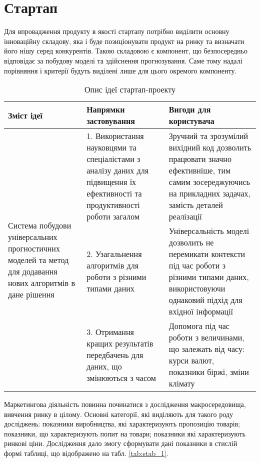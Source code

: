 \section{Стартап}
Для впровадження продукту в якості стартапу потрібно виділити основну інноваційну складову, яка і буде позиціонувати продукт на ринку та визначати його нішу серед конкурентів. Такою складовою є компонент, що безпосередньо відповідає за побудову моделі та здійснення прогнозування. Саме тому надалі порівняння і критерії будуть виділені лише для цього окремого компоненту.

\begin{table}[H]
\fontsize{12pt}{12pt}\selectfont
    \begin{tabularx}{\textwidth}{|X|X|X|}
    \hline
    Зміст ідеї & Напрямки застовування & Вигоди для користувача \\ \hline
    \multirow{3}{5cm}{Система побудови універсальних прогностичних моделей та метод для додавання  нових алгоритмів в дане рішення} & 1. Використання науковцями та спеціалістами з аналізу даних для підвищення їх ефективності та продуктивності роботи загалом & Зручний та зрозумілий вихідний код дозволить працювати значно ефективніше, тим самим зосереджуючись на прикладних задачах, замість деталей реалізації \\ \cline{2-3}
    & 2. Узагальнення алгоритмів для роботи з різними типами даних & Універсальність моделі дозволить не перемикати контексти під час роботи з різними типами даних, використовуючи однаковий підхід для вхідної інформації \\ \cline{2-3}
    & 3. Отримання кращих результатів передбачень для даних, що змінюються з часом & Допомога під час роботи з величинами, що залежать від часу: курси валют, показники біржі, зміни клімату \\
    \hline
    \end{tabularx}
\caption{Опис ідеї стартап-проекту} \label{tab:stab_0}
\end{table}

Маркетингова діяльність повинна починатися з дослідження макросередовища, вивчення ринку в цілому. Основні категорії, які виділяють для такого роду досліджень: показники виробництва, які характеризують пропозицію товарів; показники, що характеризують попит на товари; показники які характеризують ринкові ціни. Дослідження дало змогу сформувати дані показники в стислій формі таблиці, що відображено на табл. \ref{tab:stab_1}.

